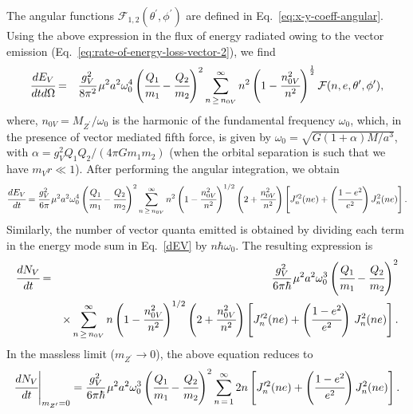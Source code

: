 \documentclass[aps,prd]{revtex4-2}
\begin{document}
The angular functions $\mathcal{F}_{1,2}(\theta^\prime, \phi^\prime)$ are defined in Eq.~\eqref{eq:x-y-coeff-angular}. Using the above expression in the flux of energy radiated owing to the vector emission (Eq.~\eqref{eq:rate-of-energy-loss-vector-2}), we find
\begin{eqnarray}\label{eq:rate-of energy-loss-vector-angular}
    \cfrac{dE_{V}}{dt d\Omega} &=& \cfrac{g_{V}^{2}}{8\pi^{2}}\,\mu^2  a^2 \omega_{0}^{4}  \left(\cfrac{Q_{1}}{m_{1}} - \cfrac{Q_{2}}{m_{2}}\right)^2 \sum_{n\,\geq\,n_{0V}}^{\infty}  n^2  \left(1 - \cfrac{n_{0V}^{2}}{n^{2}}\right)^{\frac{1}{2}}  \mathcal{F}(n, e, \theta^{\prime}, \phi^{\prime}),
\end{eqnarray}
where, $n_{0V}=M_{Z^{\prime}}/\omega_{0}$ is the harmonic of the fundamental frequency $\omega_0$, which, in the presence of
vector mediated fifth force, is given by $\omega_0=\sqrt{G(1+\alpha)M/a^3}$, with  $\alpha = g_{V}^2 Q_{1} Q_{2}/(4\pi Gm_{1} m_{2})$ (when the orbital separation is such that we have $m_{V} r \ll 1$).
After performing the angular integration, we obtain
\begin{eqnarray}\label{dEV}
    \cfrac{dE_{V}}{dt} = \cfrac{g_{V}^{2}}{6\pi}\, \mu^2 a^2 \omega_{0}^4 \left(\cfrac{Q_{1}}{m_{1}}-\cfrac{Q_{2}}{m_{2}}\right)^2\sum_{n\,\geq\,n_{0V}}^{\infty} n^{2} \left(1-\cfrac{n_{0V}^{2}}{n^2}\right)^{1/2} \left(2+\cfrac{n_{0V}^{2}}{n^2}\right) \left[J_{n}^{\prime 2}(ne) + \left(\cfrac{1-e^2}{e^2}\right) J_{n}^{2}(ne)\right].
\end{eqnarray}
Similarly, the number of vector quanta emitted is obtained by dividing each term in the energy mode sum in Eq.~\eqref{dEV} by $n \hbar \omega_0 $. The resulting expression is
\begin{eqnarray} \label{dNV}
    \cfrac{dN_{V}}{dt}
    &=& \cfrac{g_{V}^{2}}{6\pi\hbar}\, \mu^{2} a^{2} \omega_{0}^{3} \left(\cfrac{Q_{1}}{m_{1}}-\cfrac{Q_{2}}{m_{2}}\right)^{2} \nonumber \\ && \times \sum_{n\,\geq\,n_{0V}}^{\infty} n \left(1-\cfrac{n_{0V}^2}{n^2}\right)^{1/2}\left(2+\cfrac{n_{0V}^2}{n^2}\right) \left[J_{n}^{\prime 2}(ne) + \left(\cfrac{1-e^2}{e^2}\right)\,J_{n}^2(ne)\right].
\end{eqnarray}
In the massless limit ($m_{Z^{\prime}} \to 0$), the above equation reduces to
\begin{eqnarray}
    \cfrac{dN_{V}}{dt}\Bigg|_{m_{Z^{\prime}}=0}=\cfrac{g_{V}^{2}}{6\pi\hbar}\,\mu^{2} a^{2} \omega_{0}^{3}\left(\cfrac{Q_{1}}{m_{1}}-\cfrac{Q_{2}}{m_{2}}\right)^2 \sum_{n\,=\,1}^{\infty} 2n\left[J_{n}^{\prime 2}(ne) + \left(\cfrac{1-e^2}{e^2}\right) J_{n}^2(ne)\right].
\end{eqnarray}
\end{document}
